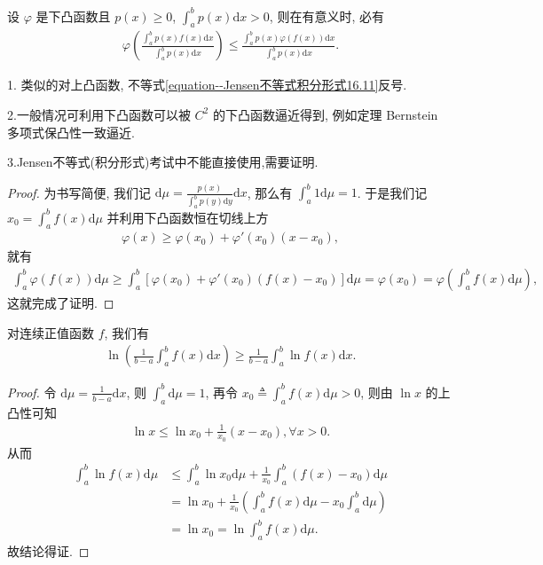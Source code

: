 \documentclass[../../main.tex]{subfiles}
\begin{document}
\begin{theorem}\label{theorem:Jensen不等式积分形式}
设 $\varphi$ 是下凸函数且 $p(x) \geqslant 0$, $\int_a^b p(x) \mathrm{d}x > 0$, 则在有意义时, 必有
\begin{align}\label{equation--Jensen不等式积分形式16.11}
\varphi\left(\frac{\int_a^b p(x)f(x)\mathrm{d}x}{\int_a^b p(x)\mathrm{d}x}\right) \leqslant \frac{\int_a^b p(x)\varphi(f(x))\mathrm{d}x}{\int_a^b p(x)\mathrm{d}x}.
\end{align}
\end{theorem}
\begin{note}
1. 类似的对上凸函数, 不等式\eqref{equation--Jensen不等式积分形式16.11}反号.

2.一般情况可利用下凸函数可以被 $C^2$ 的下凸函数逼近得到, 例如定理 Bernstein 多项式保凸性一致逼近. 

3.Jensen不等式(积分形式)考试中不能直接使用,需要证明.
\end{note}
\begin{proof}
为书写简便, 我们记 $\mathrm{d}\mu = \frac{p(x)}{\int_a^b p(y)\mathrm{d}y}\mathrm{d}x$, 那么有 $\int_a^b 1\mathrm{d}\mu = 1$. 于是我们记 $x_0 = \int_a^b f(x)\mathrm{d}\mu$ 并利用下凸函数恒在切线上方
\begin{align*}
\varphi(x) \geqslant \varphi(x_0) + \varphi'(x_0)(x - x_0),
\end{align*}
就有
\begin{align*}
\int_a^b \varphi(f(x))\mathrm{d}\mu \geqslant \int_a^b [\varphi(x_0) + \varphi'(x_0)(f(x) - x_0)]\mathrm{d}\mu = \varphi(x_0) = \varphi\left(\int_a^b f(x)\mathrm{d}\mu\right),
\end{align*}
这就完成了证明. 
\end{proof}

\begin{example}
对连续正值函数 $f$, 我们有
\begin{align*}
\ln\left(\frac{1}{b - a}\int_a^b f(x)\mathrm{d}x\right) \geqslant \frac{1}{b - a}\int_a^b \ln f(x)\mathrm{d}x.
\end{align*} 
\end{example}
\begin{proof}
令 $\mathrm{d}\mu = \frac{1}{b - a}\mathrm{d}x$, 则 $\int_a^b \mathrm{d}\mu = 1$, 再令 $x_0 \triangleq \int_a^b f(x) \mathrm{d}\mu>0$, 则由 $\ln x$ 的上凸性可知
\begin{align*}
\ln x \leqslant \ln x_0 + \frac{1}{x_0}(x - x_0), \forall x > 0.
\end{align*}
从而
\begin{align*}
\int_a^b \ln f(x) \mathrm{d}\mu &\leqslant \int_a^b \ln x_0 \mathrm{d}\mu + \frac{1}{x_0}\int_a^b (f(x) - x_0) \mathrm{d}\mu \\
&= \ln x_0 + \frac{1}{x_0}\left(\int_a^b f(x) \mathrm{d}\mu - x_0\int_a^b \mathrm{d}\mu\right) \\
&= \ln x_0 = \ln \int_a^b f(x) \mathrm{d}\mu.
\end{align*}
故结论得证.
\end{proof}
\end{document}
